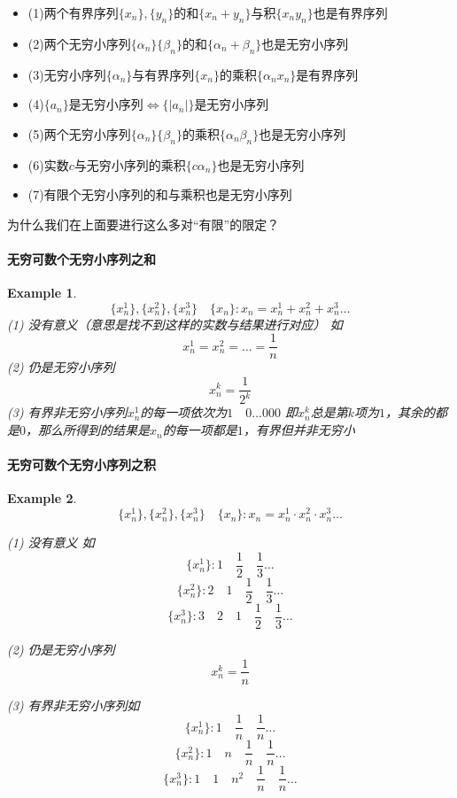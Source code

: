 \documentclass[11pt,hyperref,a4paper,UTF8]{ctexart}
\newtheorem{example}{Example}[subsection]
\begin{document}
\begin{CJK}{UTF8}{gkai}
\begin{itemize}
  \item (1)两个有界序列$\{x_n\},\{y_n\}$的和$\{x_n+y_n\}$与积$\{x_n y_n\}$也是有界序列
  \item (2)两个无穷小序列$\{\alpha_n\}\{\beta_n\}$的和$\{\alpha_n+\beta_n\}$也是无穷小序列
  \item (3)无穷小序列$\{\alpha_n\}$与有界序列$\{x_n\}$的乘积$\{\alpha_n x_n\}$是有界序列
  \item (4)$\{a_n\}$是无穷小序列$\Leftrightarrow\{|a_n|\}$是无穷小序列
  \item (5)两个无穷小序列$\{\alpha_n\}\{\beta_n\}$的乘积$\{\alpha_n\beta_n\}$也是无穷小序列
  \item (6)实数$c$与无穷小序列的乘积$\{c\alpha_n\}$也是无穷小序列
  \item (7)有限个无穷小序列的和与乘积也是无穷小序列
\end{itemize}

为什么我们在上面要进行这么多对“有限”的限定？\\
\paragraph{无穷可数个无穷小序列之和}
\begin{example}
  \[\{x_n^1\},\{x_n^2\},\{x_n^3\}\quad \{x_n\}:x_n=x_n^1+x_n^2+x_n^3\ldots\]
(1) 没有意义（意思是找不到这样的实数与结果进行对应） 如\[x_n^1=x_n^2=\ldots=\frac{1}{n}\]
(2) 仍是无穷小序列\[x_n^k=\frac{1}{2^k}\]
(3) 有界非无穷小序列$x_n^1$的每一项依次为$1\quad 0 \ldots 0 0 0$
即$x_n^k$总是第$k$项为$1$，其余的都是$0$，那么所得到的结果是$x_n$的每一项都是$1$，有界但并非无穷小

\end{example}

\paragraph{无穷可数个无穷小序列之积}
\begin{example}
  \[\{x_n^1\},\{x_n^2\},\{x_n^3\}\quad \{x_n\}:x_n=x_n^1·x_n^2·x_n^3\ldots\]

  (1) 没有意义 如
  \[\{x_n^1\}:1 \quad\frac{1}{2}\quad \frac{1}{3} \ldots\]
  \[\{x_n^2\}:2\quad1\quad \frac{1}{2}\quad \frac{1}{3}\ldots \]
  \[ \{x_n^3\}: 3 \quad2\quad 1\quad \frac{1}{2}\quad \frac{1}{3} \ldots \]

  (2) 仍是无穷小序列
  \[x_n^k=\frac{1}{n}\]

  (3) 有界非无穷小序列如
  \[\{x_n^1\}:1 \quad \frac{1}{n}\quad \frac{1}{n} \ldots\]
  \[\{x_n^2\}:1 \quad n\quad \frac{1}{n}\quad \frac{1}{n}\ldots \]
  \[\{x_n^3\}:1 \quad 1\quad n^2 \quad \frac{1}{n}\quad \frac{1}{n} \ldots \]
\end{example}


\end{CJK}
\end{document}
